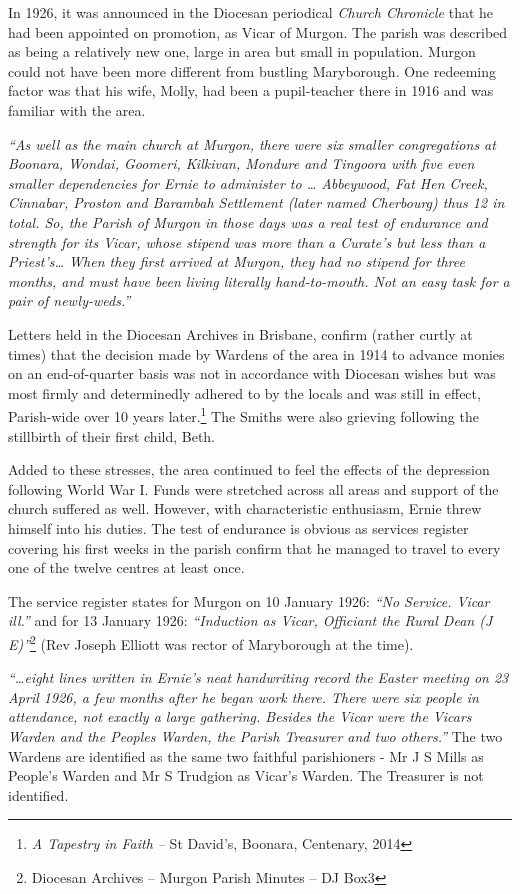 In 1926, it was announced in the Diocesan periodical \emph{Church Chronicle} that he had been appointed on promotion, as Vicar of Murgon. The parish was described as being a relatively new one, large in area but small in population. Murgon could not have been more different from bustling Maryborough. One redeeming factor was that his wife, Molly, had been a pupil-teacher there in 1916 and was familiar with the area.

\emph{``As well as the main church at Murgon, there were six smaller congregations at Boonara, Wondai, Goomeri, Kilkivan, Mondure and Tingoora with five even smaller dependencies for Ernie to administer to \ldots{} Abbeywood, Fat Hen Creek, Cinnabar, Proston and Barambah Settlement (later named Cherbourg) thus 12 in total. So, the Parish of Murgon in those days was a real test of endurance and strength for its Vicar, whose stipend was more than a Curate's but less than a Priest's\ldots{} When they first arrived at Murgon, they had no stipend for three months, and must have been living literally hand-to-mouth. Not an easy task for a pair of newly-weds.''}

Letters held in the Diocesan Archives in Brisbane, confirm (rather curtly at times) that the decision made by Wardens of the area in 1914 to advance monies on an end-of-quarter basis was not in accordance with Diocesan wishes but was most firmly and determinedly adhered to by the locals and was still in effect, Parish-wide over 10 years later.\footnote{\emph{A Tapestry in Faith --} St David's, Boonara, Centenary, 2014} The Smiths were also grieving following the stillbirth of their first child, Beth.

Added to these stresses, the area continued to feel the effects of the depression following World War I. Funds were stretched across all areas and support of the church suffered as well. However, with characteristic enthusiasm, Ernie threw himself into his duties. The test of endurance is obvious as services register covering his first weeks in the parish confirm that he managed to travel to every one of the twelve centres at least once.

The service register states for Murgon on 10 January 1926: \emph{``No Service. Vicar ill.''} and for 13 January 1926: \emph{``Induction as Vicar, Officiant the Rural Dean (J E)''}\footnote{Diocesan Archives -- Murgon Parish Minutes -- DJ Box3} (Rev Joseph Elliott was rector of Maryborough at the time).

\emph{``\ldots eight lines written in Ernie's neat handwriting record the Easter meeting on 23 April 1926, a few months after he began work there. There were six people in attendance, not exactly a large gathering. Besides the Vicar were the Vicars Warden and the Peoples Warden, the Parish Treasurer and two others.''} The two Wardens are identified as the same two faithful parishioners - Mr J S Mills as People's Warden and Mr S Trudgion as Vicar's Warden. The Treasurer is not identified.


